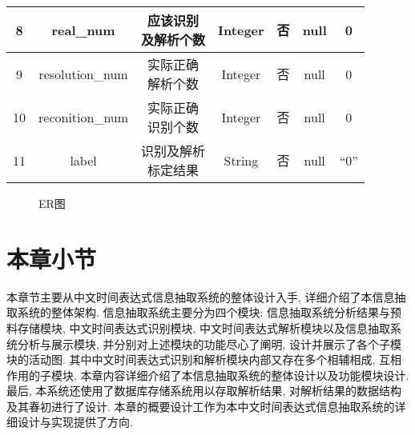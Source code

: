 \begin{table}[h]
\begin{tabular}{|*{7}{c|}}
    \hline
    8    & real\_num       & \makecell*[c]{应该识别                                                                               \\及解析个数} & Integer & 否 & null & 0 \\
    \hline
    9    & resolution\_num & \makecell*[c]{实际正确                                                                               \\解析个数} & Integer & 否 & null & 0 \\
    \hline
    10   & reconition\_num & \makecell*[c]{实际正确                                                                               \\识别个数} & Integer & 否 & null  & 0 \\
    \hline
    11   & label           & \makecell*[c]{识别及解析                                                                             \\标定结果} & String & 否 & null & “0” \\
    \hline
  \end{tabular}
\end{table}


\begin{figure}[h]
  \centering
  \caption{ER图}
  \label{fig:er_graph}
\end{figure}

\section{本章小节}

本章节主要从中文时间表达式信息抽取系统的整体设计入手, 详细介绍了本信息抽取系统的整体架构.
信息抽取系统主要分为四个模块: 信息抽取系统分析结果与预料存储模块, 中文时间表达式识别模块, 中文时间表达式解析模块以及信息抽取系统分析与展示模块, 并分别对上述模块的功能尽心了阐明, 设计并展示了各个子模块的活动图.
其中中文时间表达式识别和解析模块内部又存在多个相辅相成, 互相作用的子模块. 本章内容详细介绍了本信息抽取系统的整体设计以及功能模块设计.
最后, 本系统还使用了数据库存储系统用以存取解析结果, 对解析结果的数据结构及其春初进行了设计. 本章的概要设计工作为本中文时间表达式信息抽取系统的详细设计与实现提供了方向.

